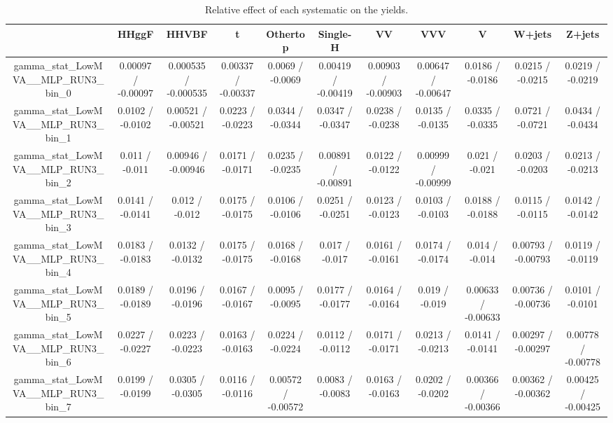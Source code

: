 \documentclass[10pt]{article}
\begin{document}
\begin{table}[htbp]
\begin{center}
\begin{tabular}{|c|c|c|c|c|c|c|c|c|c|c|}
\hline 
      & HHggF      & HHVBF      & t      & Othertop      & Single-H      & VV      & VVV      & V      & W+jets      & Z+jets \\ 
\hline 
  gamma_stat_LowMVA__MLP_RUN3_bin_0 & 0.00097 / -0.00097 & 0.000535 / -0.000535 & 0.00337 / -0.00337 & 0.0069 / -0.0069 & 0.00419 / -0.00419 & 0.00903 / -0.00903 & 0.00647 / -0.00647 & 0.0186 / -0.0186 & 0.0215 / -0.0215 & 0.0219 / -0.0219 \\ 
  gamma_stat_LowMVA__MLP_RUN3_bin_1 & 0.0102 / -0.0102 & 0.00521 / -0.00521 & 0.0223 / -0.0223 & 0.0344 / -0.0344 & 0.0347 / -0.0347 & 0.0238 / -0.0238 & 0.0135 / -0.0135 & 0.0335 / -0.0335 & 0.0721 / -0.0721 & 0.0434 / -0.0434 \\ 
  gamma_stat_LowMVA__MLP_RUN3_bin_2 & 0.011 / -0.011 & 0.00946 / -0.00946 & 0.0171 / -0.0171 & 0.0235 / -0.0235 & 0.00891 / -0.00891 & 0.0122 / -0.0122 & 0.00999 / -0.00999 & 0.021 / -0.021 & 0.0203 / -0.0203 & 0.0213 / -0.0213 \\ 
  gamma_stat_LowMVA__MLP_RUN3_bin_3 & 0.0141 / -0.0141 & 0.012 / -0.012 & 0.0175 / -0.0175 & 0.0106 / -0.0106 & 0.0251 / -0.0251 & 0.0123 / -0.0123 & 0.0103 / -0.0103 & 0.0188 / -0.0188 & 0.0115 / -0.0115 & 0.0142 / -0.0142 \\ 
  gamma_stat_LowMVA__MLP_RUN3_bin_4 & 0.0183 / -0.0183 & 0.0132 / -0.0132 & 0.0175 / -0.0175 & 0.0168 / -0.0168 & 0.017 / -0.017 & 0.0161 / -0.0161 & 0.0174 / -0.0174 & 0.014 / -0.014 & 0.00793 / -0.00793 & 0.0119 / -0.0119 \\ 
  gamma_stat_LowMVA__MLP_RUN3_bin_5 & 0.0189 / -0.0189 & 0.0196 / -0.0196 & 0.0167 / -0.0167 & 0.0095 / -0.0095 & 0.0177 / -0.0177 & 0.0164 / -0.0164 & 0.019 / -0.019 & 0.00633 / -0.00633 & 0.00736 / -0.00736 & 0.0101 / -0.0101 \\ 
  gamma_stat_LowMVA__MLP_RUN3_bin_6 & 0.0227 / -0.0227 & 0.0223 / -0.0223 & 0.0163 / -0.0163 & 0.0224 / -0.0224 & 0.0112 / -0.0112 & 0.0171 / -0.0171 & 0.0213 / -0.0213 & 0.0141 / -0.0141 & 0.00297 / -0.00297 & 0.00778 / -0.00778 \\ 
  gamma_stat_LowMVA__MLP_RUN3_bin_7 & 0.0199 / -0.0199 & 0.0305 / -0.0305 & 0.0116 / -0.0116 & 0.00572 / -0.00572 & 0.0083 / -0.0083 & 0.0163 / -0.0163 & 0.0202 / -0.0202 & 0.00366 / -0.00366 & 0.00362 / -0.00362 & 0.00425 / -0.00425 \\ 
\hline 
\end{tabular} 
\caption{Relative effect of each systematic on the yields.} 
\end{center} 
\end{table} 
\end{document}
